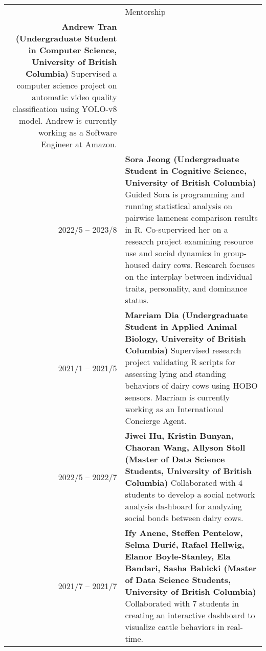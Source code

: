 \documentclass[letterpaper, 11pt]{article}
\newcommand{\headingfont}{\Large\color{OliveGreen}}
\newenvironment{SectionTable}[1]{
	\renewcommand*{\arraystretch}{1.7}
	\setlength{\tabcolsep}{10pt}
	\begin{longtable}{Rp{5.2in}} & #1 \\}
{\end{longtable}\vspace{-.3cm}}
\begin{document}
\begin{SectionTable}{\headingfont Mentorship}
\textbf{Andrew Tran (Undergraduate Student in Computer Science, University of British Columbia)} \newline
Supervised a computer science project on automatic video quality classification using YOLO-v8 model. Andrew is currently working as a Software Engineer at Amazon. \\
2022/5 -- 2023/8 &
\textbf{Sora Jeong (Undergraduate Student in Cognitive Science, University of British Columbia)} \newline
Guided Sora is programming and running statistical analysis on pairwise lameness comparison results in R. Co-supervised her on a research project examining resource use and social dynamics in group-housed dairy cows. Research focuses on the interplay between individual traits, personality, and dominance status. \\
2021/1 -- 2021/5 &
\textbf{Marriam Dia (Undergraduate Student in Applied Animal Biology, University of British Columbia)} \newline
Supervised research project validating R scripts for assessing lying and standing behaviors of dairy cows using HOBO sensors. Marriam is currently working as an International Concierge Agent. \\
2022/5 -- 2022/7 &
\textbf{Jiwei Hu, Kristin Bunyan, Chaoran Wang, Allyson Stoll (Master of Data Science Students, University of British Columbia)} \newline
Collaborated with 4 students to develop a social network analysis dashboard for analyzing social bonds between dairy cows. \\
2021/7 -- 2021/7 &
\textbf{Ify Anene, Steffen Pentelow, Selma Durić, Rafael Hellwig, Elanor Boyle-Stanley, Ela Bandari, Sasha Babicki (Master of Data Science Students, University of British Columbia)} \newline
Collaborated with 7 students in creating an interactive dashboard to visualize cattle behaviors in real-time. \\
\end{SectionTable}
\end{document}
